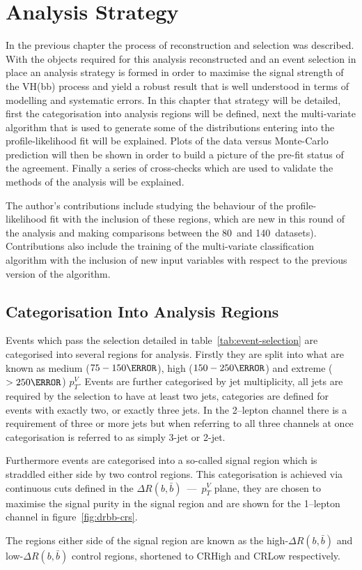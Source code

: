 \chapter{Analysis Strategy}%
\label{ch:strategy}
In the previous chapter the process of reconstruction and selection was
described. With the objects required for this analysis reconstructed and an
event selection in place an analysis strategy is formed in order to maximise the
signal strength of the VH(bb) process and yield a robust result that is well
understood in terms of modelling and systematic errors. In this chapter that
strategy will be detailed, first the categorisation into analysis regions will
be defined, next the multi-variate algorithm that is used to generate some of
the distributions entering into the profile-likelihood fit will be explained.
Plots of the data versus Monte-Carlo prediction will then be shown in order to
build a picture of the pre-fit status of the agreement. Finally a series of
cross-checks which are used to validate the methods of the analysis will be
explained.

The author's contributions include studying the behaviour of the
profile-likelihood fit with the inclusion of these regions, which are new in
this round of the analysis and making comparisons between the 80~\invfb and
140~\invfb datasets). Contributions also include the training of the
multi-variate classification algorithm with the inclusion of new input variables
with respect to the previous version of the algorithm.

\section{Categorisation Into Analysis Regions}
\label{sec:ana-regions}

Events which pass the selection detailed in table~\ref{tab:event-selection} are
categorised into several regions for analysis. Firstly they are split into what
are known as medium ($75 - 150 \GeV$), high ($150 - 250 \GeV$) and extreme ($ >
250 \GeV$) $p_T^{V}$. Events are further categorised by jet multiplicity, all
jets are required by the selection to have at least two jets, categories are
defined for events with exactly two, or exactly three jets. In the 2--lepton
channel there is a requirement of three or more jets but when referring to all
three channels at once categorisation is referred to as simply 3-jet or 2-jet.

Furthermore events are categorised into a so-called signal region which is
straddled either side by two control regions. This categorisation is achieved
via continuous cuts defined in the $\Delta R(b, \bar{b})$~---~$p_T^{V}$ plane,
they are chosen to maximise the signal purity in the signal region and are shown
for the 1--lepton channel in figure~\ref{fig:drbb-crs}.

The regions either side of the signal region are known as the
high-$\Delta R(b, \bar{b})$ and low-$\Delta R(b, \bar{b})$ control regions,
shortened to CRHigh and CRLow respectively.


